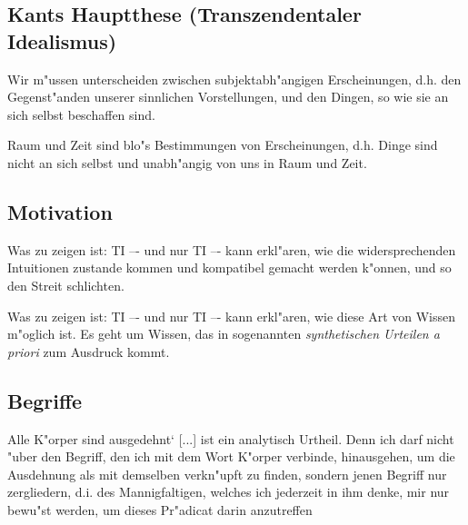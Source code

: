 \documentclass[emulatestandardclasses]{scrartcl}
\begin{document}
\subsection{Kants Hauptthese (Transzendentaler Idealismus)}

\begin{description}[leftmargin=!,labelwidth=\widthof{\bfseries ii}]
  \item[i] Wir m"ussen unterscheiden zwischen subjektabh"angigen Erscheinungen, d.h. den Gegenst"anden unserer sinnlichen Vorstellungen, und den Dingen, so wie sie an sich selbst beschaffen sind.
  \item[ii] Raum und Zeit sind blo"s Bestimmungen von Erscheinungen, d.h. Dinge sind nicht an sich selbst und unabh"angig von uns in Raum und Zeit.
\end{description}

\subsection{Motivation}

\begin{description}[leftmargin=!,labelwidth=\widthof{\bfseries Erkenntnistheorie}]
  \item[Metaphysik] Was zu zeigen ist: TI –- und nur TI –- kann erkl"aren, wie die widersprechenden Intuitionen zustande kommen und kompatibel gemacht werden k"onnen, und so den Streit schlichten.
  \item[Erkenntnistheorie] Was zu zeigen ist: TI –- und nur TI –- kann erkl"aren, wie diese Art von Wissen m"oglich ist. Es geht um Wissen, das in sogenannten \emph{synthetischen Urteilen a priori} zum Ausdruck kommt.
\end{description}


\subsection{Begriffe}

\begin{description}[leftmargin=!,labelwidth=\widthof{\bfseries ii}]
  \item[Was hei"st es, dass der Begriff des Unverheiratetseins in dem
des Junggesellen enthalten ist?] Alle K"orper sind ausgedehnt‘ [...] ist ein analytisch Urtheil. Denn ich darf nicht "uber den Begriff, den ich mit dem Wort K"orper verbinde, hinausgehen, um die Ausdehnung als mit demselben verkn"upft zu finden, sondern jenen Begriff nur zergliedern, d.i. des Mannigfaltigen, welches ich jederzeit in ihm denke, mir nur bewu"st werden, um dieses Pr"adicat darin anzutreffen
  \item[] 
\end{description}





\end{document}
